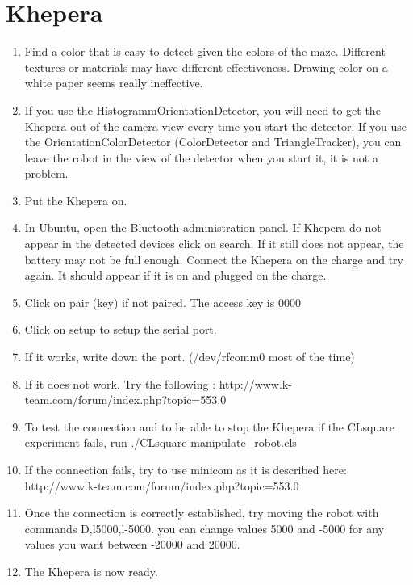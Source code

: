 \section{Khepera}

    \begin{enumerate}
        \item Find a color that is easy to detect given the colors of 
            the maze. Different textures or materials may have different 
            effectiveness. Drawing color on a white paper seems really 
            ineffective.
        \item If you use the HistogrammOrientationDetector, you will need 
            to get the Khepera out of the camera view every time you 
            start the detector. If you use the OrientationColorDetector 
            (ColorDetector and TriangleTracker), you can leave the robot 
            in the view of the detector when you start it, it is not a 
            problem.
        \item Put the Khepera on. 
        \item In Ubuntu, open the Bluetooth administration panel. If 
            Khepera do not appear in the detected devices click on 
            search. If it still does not appear, the battery may not be 
            full enough. Connect the Khepera on the charge and try 
            again. It should appear if it is on and plugged on the charge.
        \item Click on pair (key) if not paired. The access key is 0000
        \item Click on setup to setup the serial port.
        \item If it works, write down the port. (/dev/rfcomm0 most of the 
            time)
        \item If it does not work. Try the following : 
            http://www.k-team.com/forum/index.php?topic=553.0
        \item To test the connection and to be able to stop the Khepera 
            if the CLsquare experiment fails, run 
                ./CLsquare manipulate\_robot.cls
        \item If the connection fails, try to use minicom as it is 
            described here: 
            http://www.k-team.com/forum/index.php?topic=553.0
        \item Once the connection is correctly established, try moving 
            the robot with commands D,l5000,l-5000. you can change 
            values 5000 and -5000 for any values you want between -20000 
            and 20000. 
        \item The Khepera is now ready.
    \end{enumerate}

